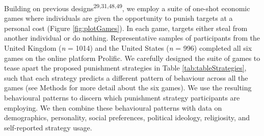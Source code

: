 \documentclass[
  english,
  man, donotrepeattitle,floatsintext]{apa6}
\begin{document}
Building on previous designs\textsuperscript{29,31,48,49}, we employ a suite of one-shot economic games where individuals
are given the opportunity to punish targets at a personal cost (Figure
\ref{fig:plotGames}). In each game, targets either steal from another
individual or do nothing. Representative samples of participants from the United
Kingdom (\emph{n} = 1014) and the
United States (\emph{n} = 996)
completed all six games on the online platform Prolific. We carefully designed
the suite of games to tease apart the proposed punishment strategies in Table
\ref{tab:tableStrategies}, such that each strategy predicts a different pattern
of behaviour across all the games (see Methods for more detail about the six
games). We use the resulting behavioural patterns to discern which punishment
strategy participants are employing. We then combine these behavioural patterns
with data on demographics, personality, social preferences, political ideology,
religiosity, and self-reported strategy usage.
\end{document}
